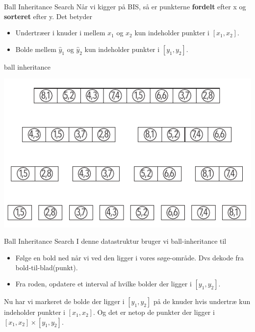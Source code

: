 \documentclass[pdf]{beamer}
\begin{document}
\begin{frame}{Ball Inheritance Search}
  Når vi kigger på BIS, så er punkterne \textbf{fordelt} efter x og \textbf{sorteret} efter y. Det betyder
  \begin{itemize}
    \item Undertræer i knuder i mellem $x_1$ og $x_2$ kun indeholder punkter i $[x_1, x_2]$.
    \item Bolde mellem $\hat{y}_1$ og $\hat{y}_2$ kun indeholder punkter i $[y_1, y_2]$.
  \end{itemize}
\end{frame}

\begin{frame}{ball inheritance}
  \begin{center}
    \includegraphics[scale=1.0]{pictures/bolde_med_to_tal.pdf}
  \end{center}
\end{frame}


\begin{frame}{Ball Inheritance Search}
  I denne datastruktur bruger vi ball-inheritance til
  \begin{itemize}
    \item Følge en bold ned når vi ved den ligger i vores søge-område. Dvs dekode fra bold-til-blad(punkt).
    \item Fra roden, opdatere et interval af hvilke bolder der ligger i $[y_1, y_2]$.
  \end{itemize}

  Nu har vi markeret de bolde der ligger i $[y_1, y_2]$ på de knuder hvis undertræ kun indeholder punkter i $[x_1, x_2]$. Og det er netop de punkter der ligger i $[x_1, x_2] \times [y_1, y_2]$.
\end{frame}
\end{document}
